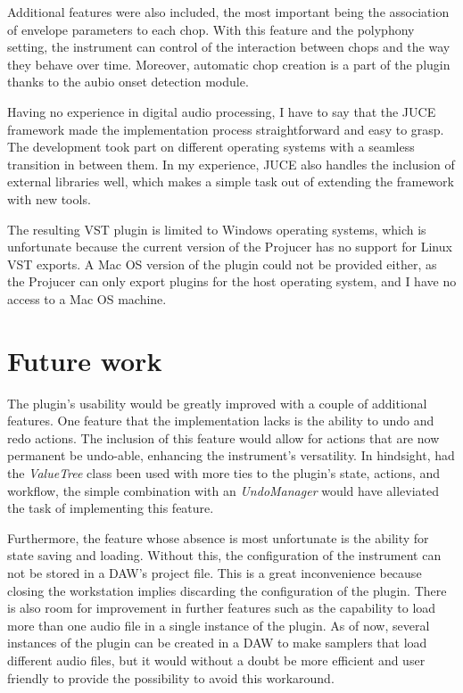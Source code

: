 \documentclass[12pt, a4paper, hidelinks]{report}
\begin{document}
	Additional features were also included, the most important being the association of envelope parameters to each chop. With this feature and the polyphony setting, the instrument can control of the interaction between chops and the way they behave over time. Moreover, automatic chop creation is a part of the plugin thanks to the aubio onset detection module.\par 
	
	Having no experience in digital audio processing, I have to say that the JUCE framework made the implementation process straightforward and easy to grasp. The development took part on different operating systems with a seamless transition in between them. In my experience, JUCE also handles the inclusion of external libraries well, which makes a simple task out of extending the framework with new tools.\par 
	
	The resulting VST plugin is limited to Windows operating systems, which is unfortunate because the current version of the Projucer has no support for Linux VST exports. A Mac OS version of the plugin could not be provided either, as the Projucer can only export plugins for the host operating system, and I have no access to a Mac OS machine. \par
	
	\section{Future work}
	The plugin's usability would be greatly improved with a couple of additional features. One feature that the implementation lacks is the ability to undo and redo actions. The inclusion of this feature would allow for actions that are now permanent be undo-able, enhancing the instrument's versatility. In hindsight, had the \textit{ValueTree} class been used with more ties to the plugin's state, actions, and workflow, the simple combination with an \textit{UndoManager} would have alleviated the task of implementing this feature.\par 
	
	Furthermore, the feature whose absence is most unfortunate is the ability for state saving and loading. Without this, the configuration of the instrument can not be stored in a DAW's project file. This is a great inconvenience because closing the workstation implies discarding the configuration of the plugin. There is also room for improvement in further features such as the capability to load more than one audio file in a single instance of the plugin. As of now, several instances of the plugin can be created in a DAW to make samplers that load different audio files, but it would without a doubt be more efficient and user friendly to provide the possibility to avoid this workaround. 
	
\end{document}
